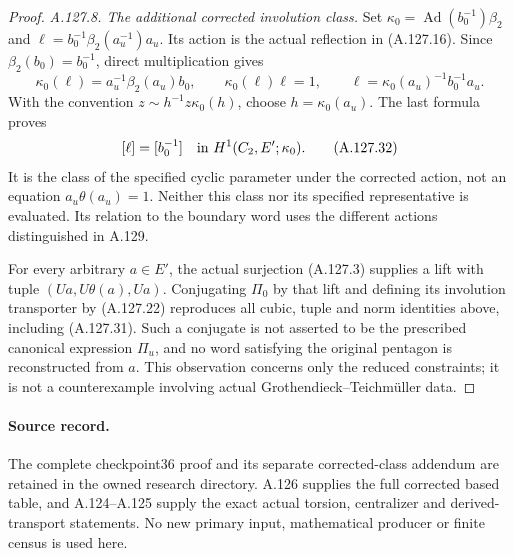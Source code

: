 \begin{proof}
\par\smallskip\noindent\emph{A.127.8. The additional corrected involution class.}
Set \(\kappa_0=\operatorname{Ad}(b_0^{-1})\beta_2\) and
\(\ell=b_0^{-1}\beta_2(a_u^{-1})a_u\). Its action is the
actual reflection in (A.127.16). Since
\(\beta_2(b_0)=b_0^{-1}\), direct multiplication gives
\[
 \kappa_0(\ell)=a_u^{-1}\beta_2(a_u)b_0,
 \qquad \kappa_0(\ell)\ell=1,
 \qquad
 \ell=\kappa_0(a_u)^{-1}b_0^{-1}a_u.
 \tag{A.127.31}
\]
With the convention \(z\sim h^{-1}z\kappa_0(h)\), choose
\(h=\kappa_0(a_u)\). The last formula proves
\[
 [\ell]=[b_0^{-1}]
 \quad\hbox{in }H^1(C_2,E';\kappa_0).
 \tag{A.127.32}
\]
It is the class of the specified cyclic parameter under the corrected
action, not an equation \(a_u\theta(a_u)=1\). Neither this class nor
its specified representative is evaluated. Its relation to the boundary
word uses the different actions distinguished in A.129.

For every arbitrary \(a\in E'\), the actual surjection (A.127.3)
supplies a lift with tuple \((Ua,U\theta(a),Ua)\). Conjugating
\(\Pi_0\) by that lift and defining its involution transporter by
(A.127.22) reproduces all cubic, tuple and norm identities above, including
(A.127.31). Such a conjugate is not asserted to be the prescribed
canonical expression \(\Pi_u\), and no word satisfying the original
pentagon is reconstructed from \(a\). This observation concerns only
the reduced constraints; it is not a counterexample involving actual
Grothendieck--Teichm\"uller data.

\end{proof}

\paragraph{Source record.}
The complete checkpoint36 proof and its separate corrected-class
addendum are retained in the owned research directory. A.126 supplies
the full corrected based table, and A.124--A.125 supply the exact actual
torsion, centralizer and derived-transport statements. No new primary
input, mathematical producer or finite census is used here.
